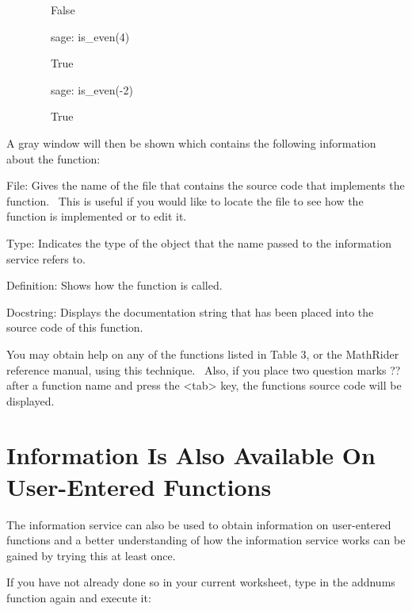 \documentclass[12pt,twoside]{book}
\begin{document}
\ \ \ \ \ \ \ \ False            

\ \ \ \ \ \ \ \ sage: is\_even(4)          

\ \ \ \ \ \ \ \ True            

\ \ \ \ \ \ \ \ sage: is\_even({}-2)         

\ \ \ \ \ \ \ \ True            


\bigskip

A gray window will then be shown which contains the following
information about the function:


\bigskip

File: Gives the name of the file that contains the source code that
implements the function. \ This is useful if you would like to locate
the file to see how the function is implemented or to edit it.


\bigskip

Type: Indicates the type of the object that the name passed to the
information service refers to.


\bigskip

Definition: Shows how the function is called.


\bigskip

Docstring: Displays the documentation string that has been placed into
the source code of this function.


\bigskip

You may obtain help on any of the functions listed in Table 3, or the
MathRider reference manual, using this technique. \ Also, if you place
two question marks {\textquotesingle}??{\textquotesingle} after a
function name and press the {\textless}tab{\textgreater} key, the
function{\textquotesingle}s source code will be displayed.

\section[Information Is Also Available On User{}-Entered
Functions]{Information Is Also Available On User{}-Entered
Functions}
The information service can also be used to obtain information on
user{}-entered functions and a better understanding of how the
information service works can be gained by trying this at least once.


\bigskip

If you have not already done so in your current worksheet, type in the
addnums function again and execute it: 


\bigskip
\end{document}
